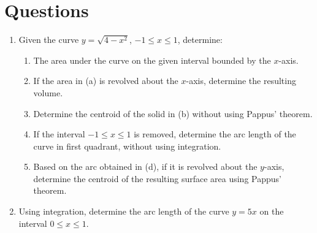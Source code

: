 \documentclass[10pt,openany,a4paper]{article}
\theoremstyle{definition}
\theoremstyle{definition}
\theoremstyle{plain}
\begin{document}
\setlength\fboxsep{3pt}
\setlength{\headheight}{24pt}
\section{Questions}
\begin{enumerate}
    \item Given the curve $y=\sqrt{4-x^2}$, $-1\leq x \leq 1$, determine:
    \begin{enumerate}
        \item The area under the curve on the given interval bounded by the $x$-axis.
        \item If the area in (a) is revolved about the $x$-axis, determine the resulting volume.
        \item Determine the centroid of the solid in (b) without using Pappus' theorem.
        \item If the interval $-1\leq x \leq 1$ is removed, determine the arc length of the curve in first quadrant, without using integration.
        \item Based on the arc obtained in (d), if it is revolved about the $y$-axis, determine the centroid of the resulting surface area using Pappus' theorem.
    \end{enumerate}
    \item Using integration, determine the arc length of the curve $y=5x$ on the interval $0\leq x\leq 1$.
\end{enumerate}
\end{document}
